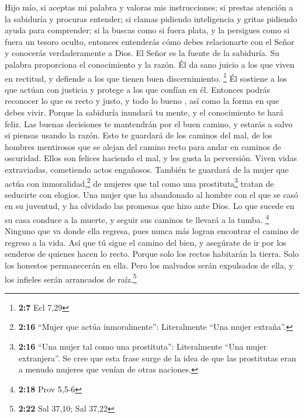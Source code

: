 Hijo mío, si aceptas mi palabra y valoras mis
instrucciones;  si prestas atención a la sabiduría y
procuras entender;  si clamas pidiendo inteligencia y
gritas pidiendo ayuda para comprender;  si la buscas como
si fuera plata, y la persigues como si fuera un tesoro oculto,
 entonces entenderás cómo debes relacionarte con el Señor
y conocerás verdaderamente a Dios.  El Señor es la fuente
de la sabiduría. Su palabra proporciona el conocimiento y la razón.
 Él da sano juicio a los que viven en rectitud, y defiende
a los que tienen buen discernimiento. \footnote{\textbf{2:7} Ecl 7,29}
 Él sostiene a los que actúan con justicia y protege a los
que confían en él.  Entonces podrás reconocer lo que es
recto y justo, y todo lo bueno , así como la forma en que debes vivir.
 Porque la sabiduría inundará tu mente, y el conocimiento
te hará feliz.  Las buenas decisiones te mantendrán por
el buen camino, y estarás a salvo si piensas usando la razón.
 Esto te guardará de los caminos del mal, de los hombres
mentirosos  que se alejan del camino recto para andar en
caminos de oscuridad.  Ellos son felices haciendo el mal,
y les gusta la perversión.  Viven vidas extraviadas,
cometiendo actos engañosos.  También te guardará de la
mujer que actúa con inmoralidad,\footnote{\textbf{2:16} ``Mujer que
  actúa inmoralmente'': Literalmente ``Una mujer extraña''.} de mujeres
que tal como una prostituta\footnote{\textbf{2:16} ``Una mujer tal como
  una prostituta'': Literalmente ``Una mujer extranjera''. Se cree que
  esta frase surge de la idea de que las prostitutas eran a menudo
  mujeres que venían de otras naciones.} tratan de seducirte con
elogios.  Una mujer que ha abandonado al hombre con el
que se casó en su juventud, y ha olvidado las promesas que hizo ante
Dios.  Lo que sucede en su casa conduce a la muerte, y
seguir sus caminos te llevará a la tumba. \footnote{\textbf{2:18} Prov
  5,5-6}  Ninguno que va donde ella regresa, pues nunca
más logran encontrar el camino de regreso a la vida.  Así
que tú sigue el camino del bien, y asegúrate de ir por los senderos de
quienes hacen lo recto.  Porque solo los rectos habitarán
la tierra. Solo los honestos permanecerán en ella.  Pero
los malvados serán expulsados de ella, y los infieles serán arrancados
de raíz.\footnote{\textbf{2:22} Sal 37,10; Sal 37,22}

